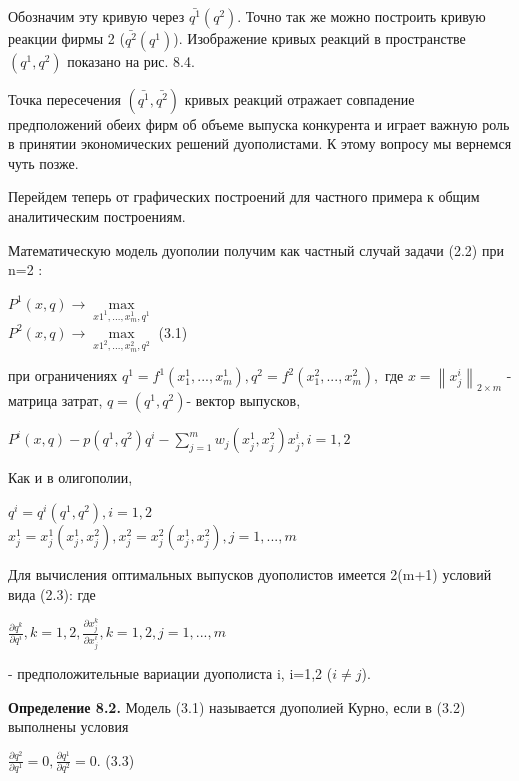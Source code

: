 \documentclass[12pt, 4paper]{book}
\begin{document}
{Обозначим эту кривую через $\bar{q^1}(q^2)$. Точно так же можно построить кривую реакции фирмы 2 ($\bar{q^2}(q^1)$). Изображение кривых реакций в пространстве $(q^1,q^2)$ показано на рис. 8.4.
\par

Точка пересечения $(\bar{q^1},\bar{q^2})$ кривых реакций отражает совпадение предположений обеих фирм об объеме выпуска конкурента и играет важную роль в принятии экономических решений дуополистами. К этому вопросу мы вернемся чуть позже.
\par

Перейдем теперь от графических построений для частного примера к общим аналитическим построениям.
\par

Математическую модель дуополии получим как частный случай задачи (2.2) при n=2 :
\begin{center}
$P^1(x,q) \rightarrow \max\limits_{x{1}^1,...,x_{m}^1,q^1}$\\
$P^2(x,q) \rightarrow \max\limits_{x{1}^2,...,x_{m}^2,q^2}$ (3.1)
\end{center}
при ограничениях $q^1=f^1(x_{1}^1,...,x_{m}^1), q^2=f^2(x_{1}^2,...,x_{m}^2),$
где $x=\left\|x_{j}^i \right\|_{2 \times m}$ - матрица затрат, $q=(q^1,q^2)$- вектор выпусков,
\begin{center}
$P^i(x,q)-p(q^1,q^2)q^i - \sum\limits_{j=1}^{m}w_j(x_{j}^1,x_{j}^2)x_{j}^i , i=1,2$
\end{center}
Как и в олигополии,
\begin{center}
$q^i=q^i(q^1,q^2) , i=1,2$\\
$x_{j}^1 = x_{j}^1(x_{j}^{1},x_{j}^2), x_{j}^2 = x_{j}^2(x_{j}^1,x_{j}^2) ,j=1,...,m$
\end{center}
\par

Для вычисления оптимальных выпусков дуополистов имеется 2(m+1) условий вида (2.3):
где 
\begin{center}
$\frac{\partial q^k}{\partial q^i}, k=1,2, \frac{\partial x_{j}^k}{\partial x_{j}^i}, k=1,2, j=1,...,m$
\end{center}
- предположительные вариации дуополиста i, i=1,2 ($i\neq j$).
\par

\textbf{Определение 8.2.} Модель (3.1) называется дуополией Курно, если в (3.2) выполнены условия
\begin{center}
$\frac{\partial q^2}{\partial q^1}=0, \frac{\partial q^1}{\partial q^2}=0.$ (3.3)
\end{center}
\par

}
\end{document}
